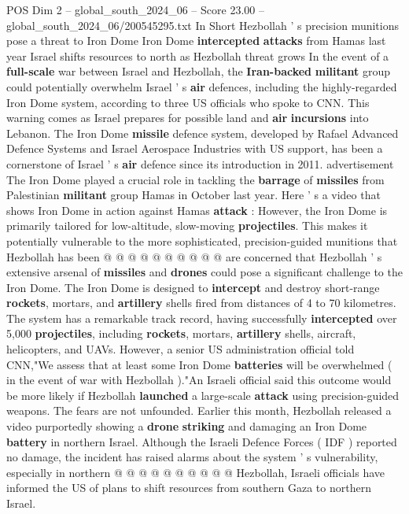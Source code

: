 \begin{textsample}{POS Dim 2 – global\_south\_2024\_06 – Score 23.00 – global\_south\_2024\_06/200545295.txt}  \label{ex:f2_pos_116}
In Short Hezbollah ' s precision munitions pose a threat to Iron Dome Iron Dome \textbf{intercepted} \textbf{attacks} from Hamas last year Israel shifts resources to north as Hezbollah threat grows In the event of a \textbf{full-scale} war between Israel and Hezbollah, the \textbf{Iran-backed} \textbf{militant} group could potentially overwhelm Israel ' s \textbf{air} defences, including the highly-regarded Iron Dome system, according to three US officials who spoke to CNN.
This warning comes as Israel prepares for possible land and \textbf{air} \textbf{incursions} into Lebanon.
The Iron Dome \textbf{missile} defence system, developed by Rafael Advanced Defence Systems and Israel Aerospace Industries with US support, has been a cornerstone of Israel ' s \textbf{air} defence since its introduction in 2011. advertisement The Iron Dome played a crucial role in tackling the \textbf{barrage} of \textbf{missiles} from Palestinian \textbf{militant} group Hamas in October last year.
Here ' s a video that shows Iron Dome in action against Hamas \textbf{attack} : However, the Iron Dome is primarily tailored for low-altitude, slow-moving \textbf{projectiles}.
This makes it potentially vulnerable to the more sophisticated, precision-guided munitions that Hezbollah has been @ @ @ @ @ @ @ @ @ @ are concerned that Hezbollah ' s extensive arsenal of \textbf{missiles} and \textbf{drones} could pose a significant challenge to the Iron Dome.
The Iron Dome is designed to \textbf{intercept} and destroy short-range \textbf{rockets}, mortars, and \textbf{artillery} shells fired from distances of 4 to 70 kilometres.
The system has a remarkable track record, having successfully \textbf{intercepted} over 5,000 \textbf{projectiles}, including \textbf{rockets}, mortars, \textbf{artillery} shells, aircraft, helicopters, and UAVs.
However, a senior US administration official told CNN,"We assess that at least some Iron Dome \textbf{batteries} will be overwhelmed ( in the event of war with Hezbollah )."An Israeli official said this outcome would be more likely if Hezbollah \textbf{launched} a large-scale \textbf{attack} using precision-guided weapons.
The fears are not unfounded.
Earlier this month, Hezbollah released a video purportedly showing a \textbf{drone} \textbf{striking} and damaging an Iron Dome \textbf{battery} in northern Israel.
Although the Israeli Defence Forces ( IDF ) reported no damage, the incident has raised alarms about the system ' s vulnerability, especially in northern @ @ @ @ @ @ @ @ @ @ Hezbollah, Israeli officials have informed the US of plans to shift resources from southern Gaza to northern Israel.

\end{textsample}
